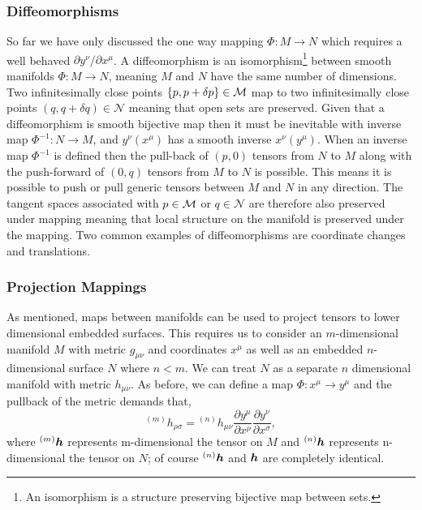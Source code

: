 \subsubsection{Diffeomorphisms}
So far we have only discussed the one way mapping $\Phi :M \rightarrow N$ which requires a well behaved $\partial y^\nu / \partial x^\mu$. A diffeomorphism is an isomorphism\footnote{An isomorphism is a structure preserving bijective map between sets.} between smooth manifolds $\Phi :M \rightarrow N$, meaning $M$ and $N$ have the same number of dimensions. Two infinitesimally close points $\{p,p+\delta p\}\in\mathcal{M}$ map to two infinitesimally close points $(q,q+\delta q)\in\mathcal{N}$ meaning that open sets are preserved. Given that a diffeomorphism is smooth bijective map then it must be inevitable with inverse map $\Phi^{-1}:N \rightarrow M$, and $y^\nu(x^\mu)$ has a smooth inverse $x^\nu(y^\mu)$. When an inverse map $\Phi^{-1}$ is defined then the pull-back of $(p,0)$ tensors from $N$ to $M$ along with the push-forward of $(0,q)$ tensors from $M$ to $N$ is possible. This means it is possible to push or pull generic tensors between $M$ and $N$ in any direction. The tangent spaces associated with $p \in \mathcal{M}$ or $q \in \mathcal{N}$ are therefore also preserved under mapping meaning that local structure on the manifold is preserved under the mapping. Two common examples of diffeomorphisms are coordinate changes and translations.

\subsubsection{Projection Mappings}
As mentioned, maps between manifolds can be used to project tensors to lower dimensional embedded surfaces. This requires us to consider an $m$-dimensional manifold $M$ with metric $g_{\mu\nu}$ and coordinates $x^\mu$ as well as an embedded $n$-dimensional surface $N$ where $n<m$. We can treat $N$ as a separate $n$ dimensional manifold with metric $h_{\mu\nu}$. As before, we can define a map $\Phi:x^\mu \rightarrow y^\mu$ and the pullback of the metric demands that,
\begin{equation}
{}^{(m)}h_{\rho\sigma} = {}^{(n)}h_{\mu\nu}\frac{\partial y^\mu  }{\partial x^\rho  } \frac{\partial y^\nu  }{\partial x^\sigma  },
\end{equation}
where ${}^{(m)}\boldsymbol{h}$ represents m-dimensional the tensor on $M$ and ${}^{(n)}\boldsymbol{h}$ represents n-dimensional the tensor on $N$; of course ${}^{(n)}\boldsymbol{h}$ and $\boldsymbol{h}$ are completely identical.

